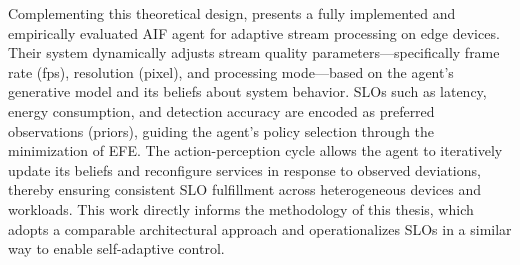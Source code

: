 Complementing this theoretical design, \cite{sedlak_adaptive_2024} presents a fully implemented and empirically evaluated AIF agent for adaptive stream processing on edge devices. Their system dynamically adjusts stream quality parameters—specifically frame rate (fps), resolution (pixel), and processing mode—based on the agent’s generative model and its beliefs about system behavior. SLOs such as latency, energy consumption, and detection accuracy are encoded as preferred observations (priors), guiding the agent’s policy selection through the minimization of EFE. The action-perception cycle allows the agent to iteratively update its beliefs and reconfigure services in response to observed deviations, thereby ensuring consistent SLO fulfillment across heterogeneous devices and workloads. This work directly informs the methodology of this thesis, which adopts a comparable architectural approach and operationalizes SLOs in a similar way to enable self-adaptive control.



